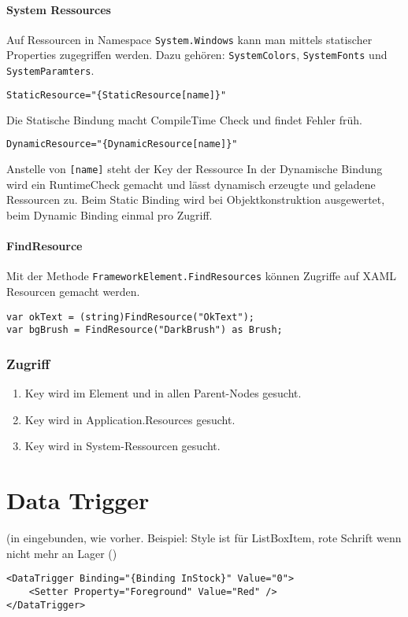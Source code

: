 \paragraph{System Ressources} Auf Ressourcen in Namespace \verb+System.Windows+ kann man mittels statischer Properties zugegriffen werden. Dazu gehören: \verb+SystemColors+, \verb+SystemFonts+ und \verb+SystemParamters+.
\begin{lstlisting}[language=xml]
StaticResource="{StaticResource[name]}"
\end{lstlisting}
Die Statische Bindung macht CompileTime Check und findet Fehler früh.
\begin{lstlisting}[language=xml]
DynamicResource="{DynamicResource[name]}"
\end{lstlisting}
Anstelle von \verb+[name]+ steht der Key der Ressource
In der Dynamische Bindung wird ein RuntimeCheck gemacht und lässt dynamisch erzeugte und geladene Ressourcen zu. Beim Static Binding wird bei Objektkonstruktion ausgewertet, beim Dynamic Binding einmal pro Zugriff.
\paragraph{FindResource} Mit der Methode \verb+FrameworkElement.FindResources+  können Zugriffe auf XAML Resourcen gemacht werden.
\begin{lstlisting}
var okText = (string)FindResource("OkText");
var bgBrush = FindResource("DarkBrush") as Brush;
\end{lstlisting}

\subsubsection{Zugriff}

\begin{enumerate}
    \item Key wird im Element und in allen Parent-Nodes gesucht.
    \item Key wird in Application.Resources gesucht.
    \item Key wird in System-Ressourcen gesucht.
\end{enumerate}


\section{Data Trigger}
(in  eingebunden, wie vorher. Beispiel: Style ist für ListBoxItem, rote Schrift wenn nicht mehr an Lager ()
\begin{lstlisting}
<DataTrigger Binding="{Binding InStock}" Value="0">
    <Setter Property="Foreground" Value="Red" />
</DataTrigger>
\end{lstlisting}

